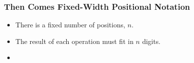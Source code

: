 \begin{frame}

\frametitle{Then Comes Fixed-Width Positional Notation}

\begin{itemize}

\item There is a fixed number of positions, $n$.

\item The result of each operation must fit in $n$ digits.

\item

\end{itemize}

\end{frame}
